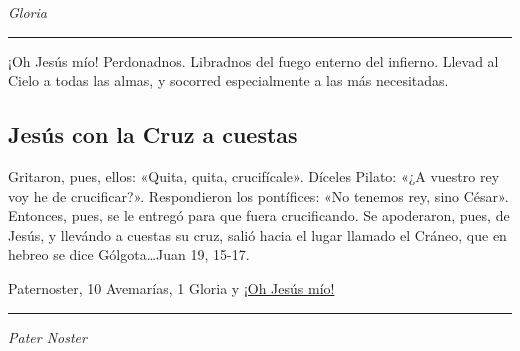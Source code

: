\documentclass[a4paper,11pt, oneside]{report}
\begin{document}
\indent\textit{Gloria} \par      

\begin{center}\rule{1\linewidth}{\linethickness}\end{center}

\medskip
\hypertarget{finalCoronacion}{¡Oh Jesús mío! Perdonadnos. Libradnos del fuego enterno del infierno. Llevad al Cielo a todas las almas, y socorred especialmente a las más 
necesitadas.}

\subsection*{Jesús con la Cruz a cuestas}

Gritaron, pues, ellos: «Quita, quita, crucifícale». Díceles Pilato: «¿A vuestro rey voy he de crucificar?». Respondieron los pontífices: «No tenemos rey,
sino César». Entonces, pues, se le entregó para que fuera crucificando. Se apoderaron, pues, de Jesús, y llevándo a cuestas su cruz, salió hacia el lugar
llamado el Cráneo, que en hebreo se dice Gólgota\ldots Juan 19, 15-17.

 Paternoster, 10 Avemarías, 1 Gloria y \hyperlink{finalCruz}{¡Oh Jesús mío!}

\begin{center}\rule{1\linewidth}{\linethickness}\end{center}

\medskip
\textit{Pater Noster}
\end{document}
